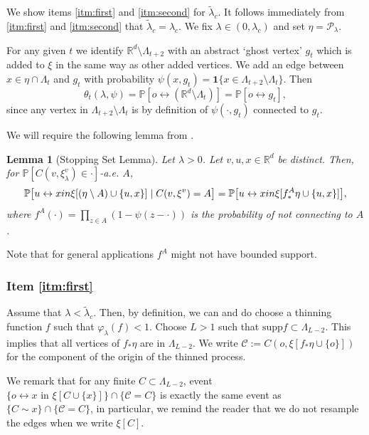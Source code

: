 \documentclass[a4paper,12pt]{scrartcl}
\newcommand{\conn}{\psi}
\renewcommand{\P}{\mathbb{P}}
\newcommand{\reals}{\mathbb{R}}
\newtheorem{lemma}[theorem]{Lemma}
\theoremstyle{definition}
\theoremstyle{remark}
\begin{document}
We show items \ref{itm:first} and \ref{itm:second} for $\tilde\lambda_c$.
It follows immediately from \ref{itm:first} and \ref{itm:second} that $\tilde\lambda_c=\lambda_c $.
We fix $\lambda\in (0,\lambda_c)$ and set $\eta = \mathcal P_\lambda$.

For any given $t$ we identify $\mathbb R^d \setminus \Lambda_{t+2}$
with an abstract `ghost vertex' $g_t$ which is added to $\xi$ in the same way as other added vertices. We add an edge between $x\in\eta\cap\Lambda_t$ and $g_t$ with probability $\conn(x,g_t)=\mathbf{1}\{x\in\Lambda_{t+2}\setminus \Lambda_t\}$. Then
\begin{equation}\label{eq:ghost}
  \theta_t(\lambda, \psi)=\P[o\leftrightarrow
  (\mathbb R^d \setminus \Lambda_t)]
  = \P[o\leftrightarrow g_t],
\end{equation}
since any vertex in $\Lambda_{t+2} \setminus \Lambda_t$ is by definition of $\conn(\cdot, g_t)$ connected to $g_t$.

We will require the following lemma from \cite[Corollary 3.4]{lace_exp_mean}.
\begin{lemma}[Stopping Set Lemma]\label{cor:stop}
  Let $\lambda >0$. Let $v,u,x \in\reals^d$ be distinct. Then, for $\P[C(v,\xi_\lambda^v) \in \cdot]$-a.e. $A$,
  \begin{equation}
    \P\big[
      u\leftrightarrow x \textup{ in } \xi[(\eta\setminus A)\cup \{u, x\}]
      \mid C(v,\xi^v) = A
    \big]
    =
    \P\big[
      u\leftrightarrow x\textup{ in } \xi[f^A_*\eta\cup\{u, x\}]
    \big],
  \end{equation}
  where $f^A(\cdot) = \prod_{z\in A} (1-\conn(z-\cdot))$ is the probability of not connecting to $A$.
\end{lemma}
Note that for general applications $f^A$ might not have bounded support.

\subsubsection{Item \ref{itm:first}}
Assume that $\lambda<\tilde\lambda_c$. Then, by definition, we can and do choose a thinning function $f$ such that $\varphi_\lambda(f)<1$. Choose $L>1$ such that $\text{supp}f\subset \Lambda_{L-2}$. This implies that all vertices of $f_*\eta$ are in $\Lambda_{L-2}$. We write $\mathcal C := C(o, \xi[f_*\eta\cup\{o\}])$ for the component of the origin of the thinned process.

We remark that for any finite $C \subset \Lambda_{L-2}$,
event
$\{o\leftrightarrow x \text{ in } \xi[C\cup \{x\}]\}\cap\{\mathcal C=C\}$ is exactly the same event as $\{C\sim x\}\cap\{\mathcal C=C\}$, in particular, we remind the reader that we do not resample the edges when we write $\xi[C]$.
\end{document}
